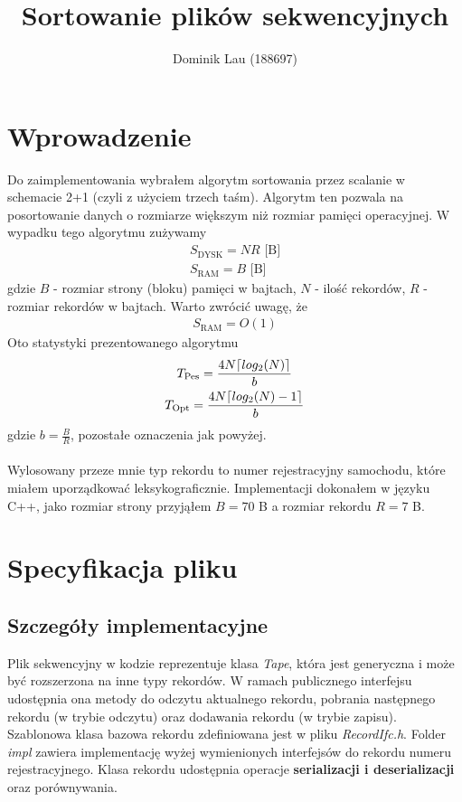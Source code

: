 \documentclass{article}
\title{Sortowanie plików sekwencyjnych}
\author{Dominik Lau (188697)}
\DeclarePairedDelimiter\ceil{\lceil}{\rceil}
\begin{document}
\maketitle

\section{Wprowadzenie}
Do zaimplementowania wybrałem algorytm sortowania przez scalanie w schemacie 2+1 (czyli z użyciem trzech taśm).  Algorytm ten pozwala na posortowanie
danych o rozmiarze większym niż rozmiar pamięci operacyjnej. W wypadku tego algorytmu zużywamy 
\begin{gather*}
	S_{\text{DYSK}} = NR \text{  [B]}\\
	S_{\text{RAM}} = B \text{  [B]}
\end{gather*}
gdzie $B$ - rozmiar strony (bloku) pamięci w bajtach, $N$ - ilość rekordów, $R$ - rozmiar rekordów w bajtach. Warto zwrócić uwagę, że 
\begin{gather*}
	S_{\text{RAM}} = O(1)
\end{gather*}
Oto statystyki prezentowanego algorytmu
\begin{gather*}
	T_{\text{Pes}} = \frac{4N\ceil{log_2(N)}}{b} \\
	T_{\text{Opt}} = \frac{4N\ceil{log_2(N) - 1}}{b}
\end{gather*}
gdzie $b = \frac{B}{R}$, pozostałe oznaczenia jak powyżej. \\\\
Wylosowany przeze mnie typ rekordu to numer rejestracyjny samochodu, które miałem uporządkować leksykograficznie. Implementacji dokonałem w 
języku C++, jako rozmiar strony przyjąłem $B=70$ B a rozmiar rekordu $R=7$ B.
\section{Specyfikacja pliku}
\subsection{Szczegóły implementacyjne}
Plik sekwencyjny w kodzie reprezentuje klasa \textit{Tape}, która jest generyczna i może być rozszerzona na inne typy rekordów. W ramach publicznego
interfejsu udostępnia ona metody do odczytu aktualnego rekordu, pobrania następnego rekordu (w trybie odczytu) oraz dodawania rekordu (w trybie zapisu).
Szablonowa klasa bazowa rekordu zdefiniowana jest w pliku \textit{RecordIfc.h}.  
Folder \textit{impl} zawiera implementację wyżej wymienionych interfejsów
do rekordu numeru rejestracyjnego.  Klasa rekordu udostępnia operacje \textbf{serializacji i deserializacji} oraz porównywania.
\end{document}
